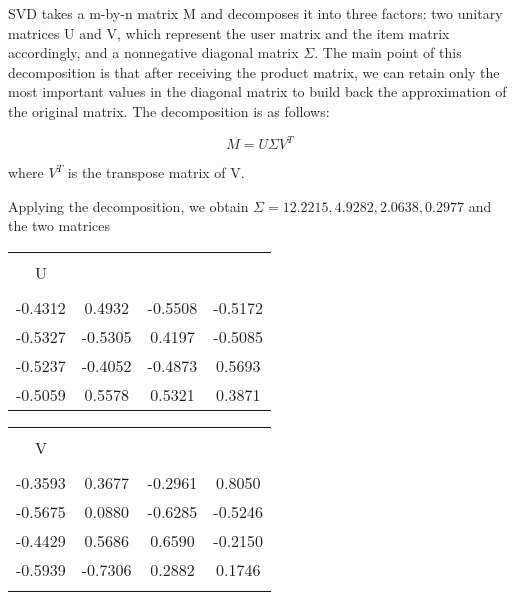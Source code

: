 SVD takes a m-by-n matrix M and decomposes it into three factors: two unitary matrices U and V, which represent the user matrix and the item matrix accordingly, and a nonnegative diagonal matrix \(\Sigma \). The main point of this decomposition is that after receiving the product matrix, we can retain only the most important values in the diagonal matrix to build back the approximation of the original matrix. The decomposition is as follows:

\begin{displaymath}
M = U \Sigma V^T
\end{displaymath}

where \(V^T\) is the transpose matrix of V. 

Applying the decomposition, we obtain \(\Sigma = {12.2215, 4.9282, 2.0638, 0.2977} \) and the two matrices

\noindent\begin{minipage}[t]{\textwidth}
\begin{minipage}[t][5cm][t]{\dimexpr0.5\textwidth-0.5\Colsep\relax}

\begin{tabular}{c c c c}
\hline\hline \\
U \\
\hline \\
-0.4312 & 0.4932 & -0.5508 & -0.5172 \\
-0.5327 & -0.5305 & 0.4197 & -0.5085 \\
-0.5237 & -0.4052 & -0.4873 & 0.5693 \\
-0.5059 & 0.5578 & 0.5321 & 0.3871 \\
\hline\hline
\end{tabular}

\end{minipage}\hfill
\begin{minipage}[t][5cm][t]{\dimexpr0.5\textwidth-0.5\Colsep\relax}

\begin{tabular}{c c c c}
\hline\hline \\
V \\
\hline \\
-0.3593 & 0.3677 & -0.2961 & 0.8050 \\
-0.5675 & 0.0880 & -0.6285 & -0.5246 \\
-0.4429 & 0.5686 & 0.6590 & -0.2150 \\
-0.5939 & -0.7306 & 0.2882 & 0.1746 \\
\hline\hline \\
\end{tabular}
\end{minipage}%
\end{minipage}

